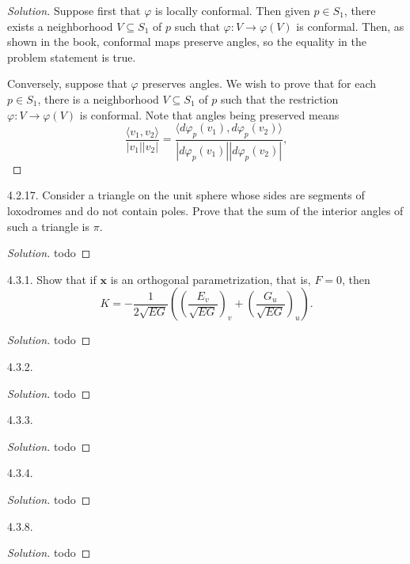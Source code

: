 \documentclass[10pt]{scrartcl}
\providecommand{\mb}[1]{\mathbf{#1}}
\newenvironment{soln}{\begin{proof}[Solution]}{\end{proof}}
\begin{document}
\begin{soln}
	Suppose first that $\varphi$ is locally conformal.
	Then given $p\in S_1$, there exists a neighborhood $V\subseteq S_1$
	of $p$ such that $\varphi\colon V\to\varphi(V)$ is conformal.
	Then, as shown in the book, conformal maps preserve angles, so the equality
	in the problem statement is true.
	
	Conversely, suppose that $\varphi$ preserves angles. We wish to prove that
	for each $p\in S_1$, there is a neighborhood $V\subseteq S_1$ of $p$
	such that the restriction $\varphi\colon V\to \varphi(V)$ is conformal.
	Note that angles being preserved means
	\[\frac{\langle v_1,v_2\rangle}{|v_1||v_2|} =
	\frac{\langle d\varphi_p(v_1),d\varphi_p(v_2)\rangle}
	{|d\varphi_p(v_1)||d\varphi_p(v_2)|},\]
\end{soln}

\begin{problem*}4.2.17.
	Consider a triangle on the unit sphere whose sides are segments
	of loxodromes and do not contain poles.
	Prove that the sum of the interior angles of such a triangle is $\pi$.
\end{problem*}

\begin{soln}
	todo
\end{soln}

\begin{problem*}4.3.1.
	Show that if $\mb x$ is an orthogonal parametrization,
	that is, $F = 0$, then
	\[K = -\frac{1}{2\sqrt{EG}}\left(\left(\frac{E_v}{\sqrt{EG}}\right)_v +
	\left(\frac{G_u}{\sqrt{EG}}\right)_u\right).\]
\end{problem*}

\begin{soln}
	todo
\end{soln}

\begin{problem*}4.3.2.
	
\end{problem*}

\begin{soln}
	todo
\end{soln}

\begin{problem*}4.3.3.
	
\end{problem*}

\begin{soln}
	todo
\end{soln}

\begin{problem*}4.3.4.
	
\end{problem*}

\begin{soln}
	todo
\end{soln}

\begin{problem*}4.3.8.
	
\end{problem*}

\begin{soln}
	todo
\end{soln}
\end{document}
